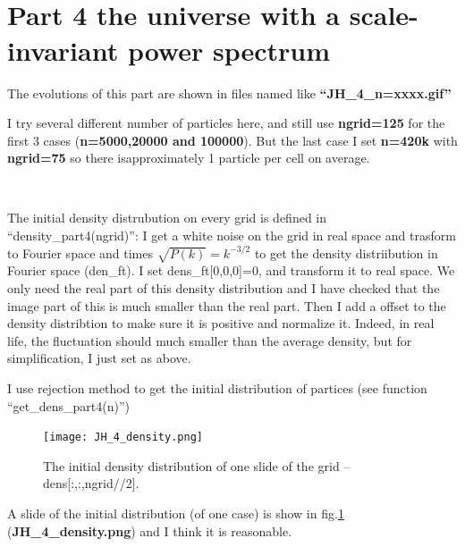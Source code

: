 \documentclass[showpacs, oneside, onecolumn, prl, amsmath, amssymb, nofootinbib, superscriptaddress, notitlepage]{revtex4-1}
\newcommand\bfig{\begin{figure}}
\newcommand\efig{\end{figure}}
\begin{document}
~~~~

~~~~

\section{Part 4 the universe with a scale-invariant power spectrum}

The evolutions of this part are shown in files named like \textbf{``JH\_4\_n=xxxx.gif''}

I try several different number of particles here, and still use \textbf{ngrid=125} for the first 3 cases (\textbf{n=5000,20000 and 100000}). But the last case I set \textbf{n=420k} with \textbf{ngrid=75} so there isapproximately 1 particle per cell on average.

~~~~

The initial density distrubution on every grid is defined in ``density\_part4(ngrid)'':\newline
I get a white noise on the grid in real space and trasform to Fourier space and times $\sqrt{P(k)}=k^{-3/2}$ to get the density distriibution in Fourier space (den\_ft). I set dens\_ft[0,0,0]=0, and transform it to real space. We only need the real part of this density distribution and I have checked that the image part of this is much smaller than the real part. Then I add a offset to the density distribtion to make sure it is positive and normalize it.\newline
Indeed, in real life, the fluctuation should much smaller than the average density, but for simplification, I just set as above.

I use rejection method to get the initial distribution of partices (see function ``get\_dens\_part4(n)'')

\bfig
	\centering
	\texttt{[image: JH\_4\_density.png]}
	\caption{The initial density distribution of one slide of the grid -- dens[:,:,ngrid//2].}
	\label{4-density}
\efig

A slide of the initial distribution (of one case) is show in fig.\ref{4-density} (\textbf{JH\_4\_density.png}) and I think it is reasonable.
\end{document}
